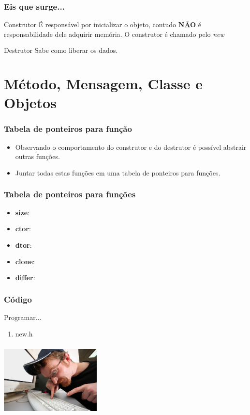 \documentclass{beamer}
\begin{document}
\begin{frame}
 \frametitle{Eis que surge...}
 \pause
 \begin{block}{Construtor}
  É responsável por inicializar o objeto, contudo \textbf{NÃO} é	
  responsabilidade dele adquirir memória. O construtor é chamado pelo 
  \textit{new}
 \end{block}
 
  \pause
  \begin{block}{Destrutor}
   Sabe como liberar os dados.
  \end{block}

\end{frame}

\section{Método, Mensagem, Classe e Objetos}

\begin{frame}
  \frametitle{Tabela de ponteiros para função}
  \begin{itemize}
   \item<1-> Observando o comportamento do construtor e do destrutor é possível 
    abstrair outras funções.
   \item<2-> Juntar todas estas funções em uma tabela de ponteiros para funções.
  \end{itemize}

\end{frame}

\begin{frame}
 \frametitle{Tabela de ponteiros para funções}
 \begin{itemize}
  \item<1-> \textbf{size}:
  \item<2-> \textbf{ctor}:
  \item<3-> \textbf{dtor}:
  \item<4-> \textbf{clone}:
  \item<5-> \textbf{differ}:
 \end{itemize}

\end{frame}

\begin{frame}
  \frametitle{Código}
  Programar...
  \begin{enumerate}
   \item new.h
  \end{enumerate}

  \begin{center}
    \includegraphics[height = 1.5in, width = 2in]{image/programming2.jpg}
  \end{center}
\end{frame}
\end{document}
